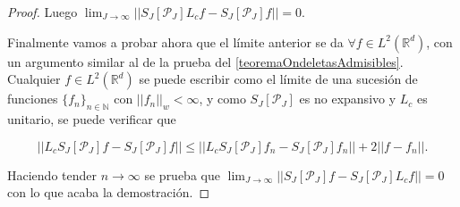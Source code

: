 \begin{proof}
\noindent Luego $\lim_{J\rightarrow\infty}||S_J[\mathcal{P}_J] L_cf - S_J[\mathcal{P}_J]f ||=0$.

\medskip

\noindent Finalmente vamos a probar ahora que el límite anterior se da $\forall f \in L^2(\mathbb{R}^d)$, con un argumento similar al de la prueba del \autoref{teoremaOndeletasAdmisibles}. Cualquier $f\in L^2(\mathbb{R}^d)$ se puede escribir como el límite de una sucesión de funciones $\lbrace f_n \rbrace_{n\in\mathbb{N}}$ con $||f_n||_w < \infty$, y como $S_J[\mathcal{P}_J]$ es no expansivo y $L_c$ es unitario, se puede verificar que 

$$||L_c S_J[\mathcal{P}_J]f-S_J[\mathcal{P}_J]f|| \leq ||L_c S_J [\mathcal{P}_J]f_n -S_J[\mathcal{P}_J]f_n|| + 2||f-f_n||.$$

\noindent Haciendo tender $n \rightarrow \infty$ se prueba que $\lim_{J\rightarrow \infty}||S_J[\mathcal{P}_J] f-S_J[\mathcal{P}_J] L_cf||=0$ con lo que acaba la demostración. \qedhere
\end{proof}


\endinput